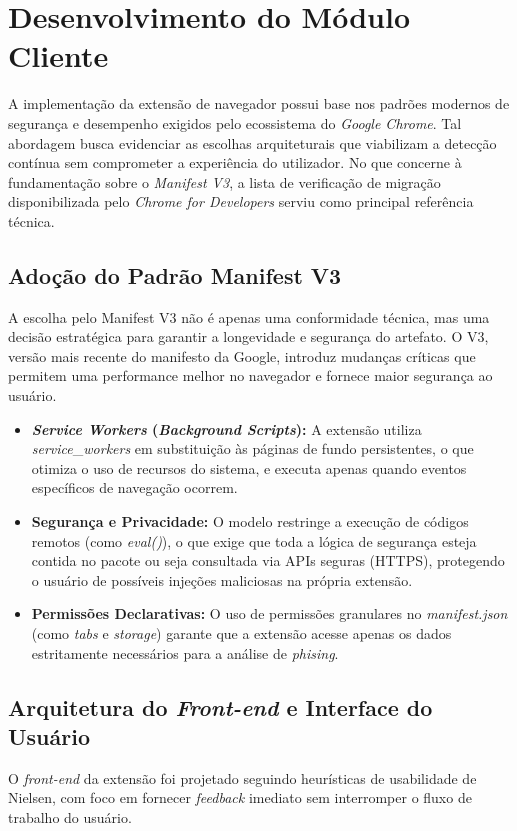 \documentclass[a4paper,12pt]{article}
\begin{document}
\section{Desenvolvimento do Módulo Cliente}
\label{sec:Desenvolvimento do Módulo do Cliente}

A implementação da extensão de navegador possui base nos padrões modernos de segurança e desempenho exigidos pelo ecossistema do \textit{Google Chrome}. Tal abordagem busca evidenciar as escolhas arquiteturais que viabilizam a detecção contínua sem comprometer a experiência do utilizador. No que concerne à fundamentação sobre o \textit{Manifest V3}, a lista de verificação de migração disponibilizada pelo \textit{Chrome for Developers} \cite{chrome_v3_checklist} serviu como principal referência técnica.

\subsection{Adoção do Padrão Manifest V3}
A escolha pelo Manifest V3 não é apenas uma conformidade técnica, mas uma decisão estratégica para garantir a longevidade e segurança do artefato. O V3, versão mais recente do manifesto da Google, introduz mudanças críticas que permitem uma performance melhor no navegador e fornece maior segurança ao usuário. 

\begin{itemize}
    \item \textbf{\textit{Service Workers} (\textit{Background Scripts}):}
    A extensão utiliza \textit{service}\_\textit{workers} em substituição às páginas de fundo persistentes, o que otimiza o uso de recursos do sistema, e executa apenas quando eventos específicos de navegação ocorrem. 
    \item \textbf{Segurança e Privacidade:} O modelo restringe a execução de códigos remotos (como \textit{eval()}), o que exige que toda a lógica de segurança esteja contida no pacote ou seja consultada via APIs seguras (HTTPS), protegendo o usuário de possíveis injeções maliciosas na própria extensão.
    \item \textbf{Permissões Declarativas:} O uso de permissões granulares no \textit{manifest.json} (como \textit{tabs} e \textit{storage}) garante que a extensão acesse apenas os dados estritamente necessários para a análise de \textit{phising}.
\end{itemize}

\subsection{\textbf{Arquitetura do \textit{Front-end} e Interface do Usuário}}
O \textit{front-end} da extensão foi projetado seguindo heurísticas de usabilidade de Nielsen, com foco em fornecer \textit{feedback} imediato sem interromper o fluxo de trabalho do usuário. \cite{nielsenheuristics}
\end{document}
